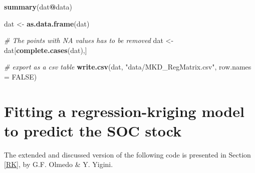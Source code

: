 \documentclass[10pt,b5paper,]{book}
\newenvironment{Shaded}{\begin{snugshade}}{\end{snugshade}}
\newcommand{\CommentTok}[1]{\textcolor[rgb]{0.56,0.35,0.01}{\textit{#1}}}
\newcommand{\DataTypeTok}[1]{\textcolor[rgb]{0.13,0.29,0.53}{#1}}
\newcommand{\KeywordTok}[1]{\textcolor[rgb]{0.13,0.29,0.53}{\textbf{#1}}}
\newcommand{\NormalTok}[1]{#1}
\newcommand{\OperatorTok}[1]{\textcolor[rgb]{0.81,0.36,0.00}{\textbf{#1}}}
\newcommand{\OtherTok}[1]{\textcolor[rgb]{0.56,0.35,0.01}{#1}}
\newcommand{\StringTok}[1]{\textcolor[rgb]{0.31,0.60,0.02}{#1}}
\theoremstyle{definition}
\theoremstyle{definition}
\theoremstyle{definition}
\theoremstyle{remark}
\begin{document}
\begin{Shaded}
\begin{Highlighting}[]
\KeywordTok{summary}\NormalTok{(dat}\OperatorTok{@}\NormalTok{data)}

\NormalTok{dat <-}\StringTok{ }\KeywordTok{as.data.frame}\NormalTok{(dat)}

\CommentTok{# The points with NA values has to be removed}
\NormalTok{dat <-}\StringTok{ }\NormalTok{dat[}\KeywordTok{complete.cases}\NormalTok{(dat),]}

\CommentTok{# export as a csv table}
\KeywordTok{write.csv}\NormalTok{(dat, }\StringTok{"data/MKD_RegMatrix.csv"}\NormalTok{, }\DataTypeTok{row.names =} \OtherTok{FALSE}\NormalTok{)}
\end{Highlighting}
\end{Shaded}

\clearpage

\hypertarget{cd:RK}{%
\section{Fitting a regression-kriging model to predict the SOC
stock}\label{cd:RK}}

The extended and discussed version of the following code is presented in
Section \ref{RK}, by G.F. Olmedo \& Y. Yigini.
\end{document}
